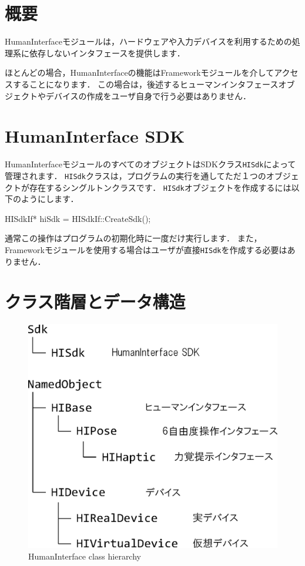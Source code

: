 \section{\KLUDGE 概要}

HumanInterface\KLUDGE モジュールは，ハードウェアや入力デバイスを利用するための処理系に依存しないインタフェースを提供します．

\KLUDGE ほとんどの場合，HumanInterface\KLUDGE の機能はFramework\KLUDGE モジュールを介してアクセスすることになります．
\KLUDGE この場合は，後述するヒューマンインタフェースオブジェクトやデバイスの作成をユーザ自身で行う必要はありません．

\section{HumanInterface SDK}

HumanInterface\KLUDGE モジュールのすべてのオブジェクトはSDK\KLUDGE クラス\texttt{HISdk}\KLUDGE によって管理されます．
\texttt{HISdk}\KLUDGE クラスは，プログラムの実行を通してただ１つのオブジェクトが存在するシングルトンクラスです．
\texttt{HISdk}\KLUDGE オブジェクトを作成するには以下のようにします．
\begin{sourcecode}
HISdkIf* hiSdk = HISdkIf::CreateSdk();
\end{sourcecode}
\KLUDGE 通常この操作はプログラムの初期化時に一度だけ実行します．
\KLUDGE また，Framework\KLUDGE モジュールを使用する場合はユーザが直接\texttt{HISdk}\KLUDGE を作成する必要はありません．

\section{\KLUDGE クラス階層とデータ構造}

\begin{figure}[t]
\begin{center}
\includegraphics[width=.5\hsize]{fig/hiclass.eps}
\end{center}
\caption{HumanInterface class hierarchy}
\label{fig_hiclass}
\end{figure}

